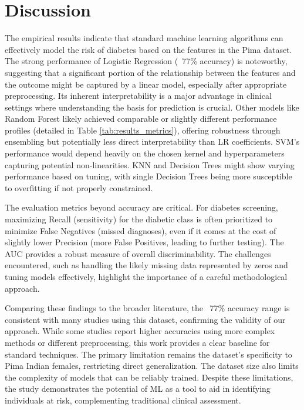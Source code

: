 \documentclass[conference]{IEEEtran}
\begin{document}
\section{Discussion}
The empirical results indicate that standard machine learning algorithms can effectively model the risk of diabetes based on the features in the Pima dataset. The strong performance of Logistic Regression (~77\% accuracy) is noteworthy, suggesting that a significant portion of the relationship between the features and the outcome might be captured by a linear model, especially after appropriate preprocessing. Its inherent interpretability is a major advantage in clinical settings where understanding the basis for prediction is crucial. Other models like Random Forest likely achieved comparable or slightly different performance profiles (detailed in Table \ref{tab:results_metrics}), offering robustness through ensembling but potentially less direct interpretability than LR coefficients. SVM's performance would depend heavily on the chosen kernel and hyperparameters capturing potential non-linearities. KNN and Decision Trees might show varying performance based on tuning, with single Decision Trees being more susceptible to overfitting if not properly constrained.

The evaluation metrics beyond accuracy are critical. For diabetes screening, maximizing Recall (sensitivity) for the diabetic class is often prioritized to minimize False Negatives (missed diagnoses), even if it comes at the cost of slightly lower Precision (more False Positives, leading to further testing). The AUC provides a robust measure of overall discriminability. The challenges encountered, such as handling the likely missing data represented by zeros and tuning models effectively, highlight the importance of a careful methodological approach.

Comparing these findings to the broader literature, the ~77\% accuracy range is consistent with many studies using this dataset, confirming the validity of our approach. While some studies report higher accuracies using more complex methods or different preprocessing, this work provides a clear baseline for standard techniques. The primary limitation remains the dataset's specificity to Pima Indian females, restricting direct generalization. The dataset size also limits the complexity of models that can be reliably trained. Despite these limitations, the study demonstrates the potential of ML as a tool to aid in identifying individuals at risk, complementing traditional clinical assessment.
\end{document}
